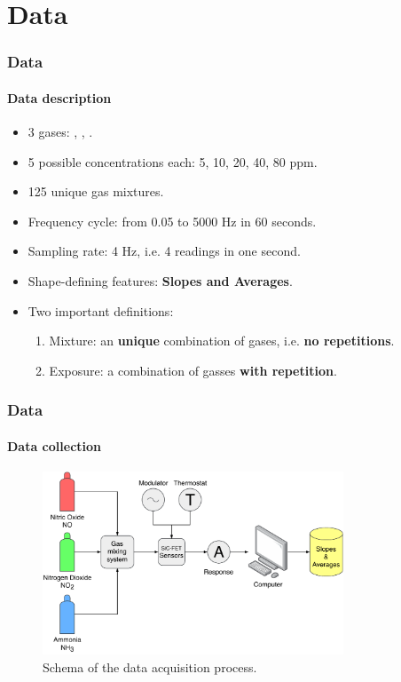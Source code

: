 \documentclass{beamer}
\begin{document}
\section{Data}
\begin{frame}
	\frametitle{Data}
	\framesubtitle{Data description}
	
	\begin{itemize}
		\pause
		\item 3 gases:  , , .
		\pause
		\item 5 possible concentrations each: 5, 10, 20, 40, 80 ppm.
		\pause
		\item 125 unique gas mixtures.
		\pause
		\item Frequency cycle: from 0.05 to 5000 Hz in 60 seconds.
		\pause
		\item Sampling rate: 4 Hz, i.e. 4 readings in one second.
		\pause
		\item Shape-defining features: \textbf{Slopes and Averages}.
		\pause
		\item Two important definitions:
		\begin{enumerate}
			\pause
			\item Mixture: an \textbf{unique} combination of gases, i.e. \textbf{no repetitions}.
			\pause
			\item Exposure: a combination of gasses \textbf{with repetition}.
		\end{enumerate}
	
\end{itemize}
\end{frame}

\begin{frame}
	\frametitle{Data}
	\framesubtitle{Data collection}
	
	\begin{figure}[!htb]
		\centering
		\includegraphics[width=0.8\textwidth]{../../figures/experimental-setup.pdf}
		\caption{Schema of the data acquisition process.}
	\end{figure}
\end{frame}
\end{document}
